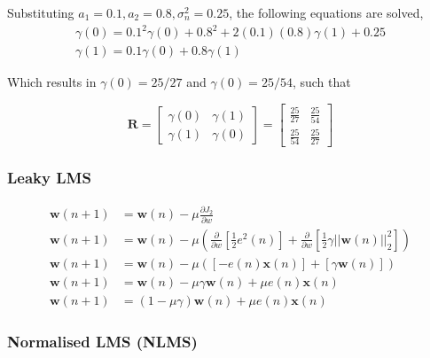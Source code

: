 \documentclass[main.tex]{subfiles}
\begin{document}
Substituting $a_1 = 0.1, a_2 = 0.8, \sigma_n^2 = 0.25$, the following equations are solved,
\begin{align*}
\gamma(0) = 0.1^2\gamma(0) + 0.8^2 + 2(0.1)(0.8)\gamma(1) + 0.25\\
\gamma(1) = 0.1\gamma(0) + 0.8\gamma(1)
\end{align*}

Which results in $\gamma(0) = 25/27$ and $\gamma(0) = 25/54$, such that

\begin{equation}
\textbf{R} = \left[
\begin{array}{cc}
\gamma(0) & \gamma(1) \\[6pt]
\gamma(1) &  \gamma(0) \end{array}
\right] = \left[
\begin{array}{cc}
\frac{25}{27} & \frac{25}{54} \\[6pt]
\frac{25}{54} &  \frac{25}{27} \end{array}
\right]
\end{equation}



\subsubsection{Leaky LMS}

\begin{align*}
\textbf{w}(n+1) &= \textbf{w}(n) - \mu\frac{\partial J_2}{\partial w}\\
\textbf{w}(n+1) &= \textbf{w}(n) - \mu\left(\frac{\partial}{\partial w}\left[\frac{1}{2}e^2(n)\right] + \frac{\partial}{\partial w}\left[\frac{1}{2}\gamma||\textbf{w}(n)||^2_2\right]\right)\\
\textbf{w}(n+1) &= \textbf{w}(n) - \mu\left(\left[-e(n)\textbf{x}(n)\right] + \left[\gamma\textbf{w}(n)\right]\right)\\
\textbf{w}(n+1) &= \textbf{w}(n) - \mu\gamma\textbf{w}(n) + \mu e(n)\textbf{x}(n)\\
\textbf{w}(n+1) &= (1-\mu\gamma)\textbf{w}(n) + \mu e(n)\textbf{x}(n)
\end{align*}




\subsubsection{Normalised LMS (NLMS)}
\end{document}

